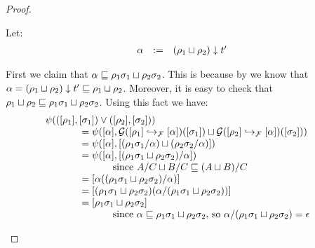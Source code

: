 \begin{proof}
\begin{enumerate}
\begin{enumerate}
\begin{enumerate}
      Let:
      \[
      \begin{array}{rcl}
        \alpha & := & (\rho_1 \sqcup \rho_2) \downarrow t'
      \end{array}
      \]

      First we claim that $\alpha \sqsubseteq \rho_1\sigma_1 \sqcup \rho_2\sigma_2$.
      This is because by 
      we know that $\alpha = (\rho_1 \sqcup \rho_2) \downarrow t' \sqsubseteq \rho_1 \sqcup \rho_2$.
      Moreover, it is easy to check that
      $\rho_1 \sqcup \rho_2 \sqsubseteq \rho_1\sigma_1 \sqcup \rho_2\sigma_2$.
      Using this fact we have:
      \[
      \begin{array}{rll}
        \psi((\cls{\redseq_1},\cls{\redseqtwo_1}) \lor (\cls{\redseq_2},\cls{\redseqtwo_2})) & & \\
      & \hspace{-3cm} =
        \psi(\cls{\alpha},\ulbG(\ptF{\cls{\alpha}}{\cls{\redseq_1}})(\cls{\redseqtwo_1}) \sqcup \ulbG(\ptF{\cls{\alpha}}{\cls{\redseq_2}})(\cls{\redseqtwo_2}))
      \\
      & \hspace{-3cm} =
        \psi(\cls{\alpha}, \cls{(\redseq_1\redseqtwo_1/\alpha) \sqcup (\redseq_2\redseqtwo_2/\alpha)})
      \\
      & \hspace{-3cm} =
        \psi(\cls{\alpha}, \cls{(\redseq_1\redseqtwo_1 \sqcup \redseq_2\redseqtwo_2)/\alpha})
        \\&\hspace{-2cm}\text{ since $A/C \sqcup B/C \permle (A \sqcup B)/C$} \\
      & \hspace{-3cm} =
        \cls{\alpha((\redseq_1\redseqtwo_1 \sqcup \redseq_2\redseqtwo_2)/\alpha)} \\
      & \hspace{-3cm} =
        \cls{(\redseq_1\redseqtwo_1 \sqcup \redseq_2\redseqtwo_2)(\alpha/(\redseq_1\redseqtwo_1 \sqcup \redseq_2\redseqtwo_2))} \\
      & \hspace{-3cm} =
        \cls{\redseq_1\redseqtwo_1 \sqcup \redseq_2\redseqtwo_2}
        \\&\hspace{-2cm}\text{ since
                     $\alpha \permle \redseq_1\redseqtwo_1 \sqcup \redseq_2\redseqtwo_2$,
                   so $\alpha/(\redseq_1\redseqtwo_1 \sqcup \redseq_2\redseqtwo_2) = \emptyDerivation$} \\

\end{array}\]
\end{enumerate}
\end{enumerate}
\end{enumerate}
\end{proof}

